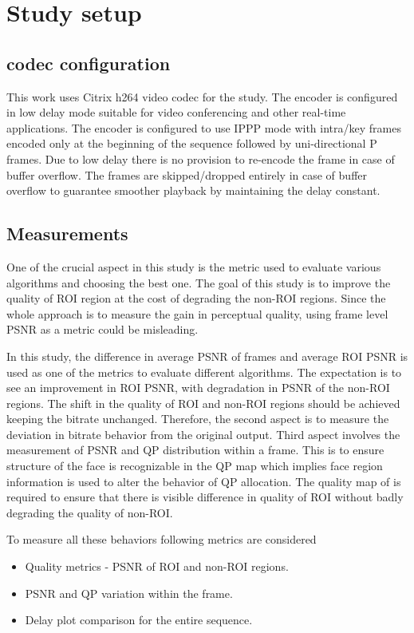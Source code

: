 \documentclass[11pt]{article} %
\begin{document}
\section{Study setup}
\subsection{codec configuration}      
This work uses Citrix h264 video codec for the study. The encoder is configured in low delay mode suitable for video conferencing and other real-time applications. The encoder is configured to use IPPP mode with intra/key frames encoded only at the beginning of the sequence followed by uni-directional P frames. Due to low delay there is no provision to re-encode the frame in case of buffer overflow. The frames are skipped/dropped entirely in case of buffer overflow to guarantee smoother playback by maintaining the delay constant. 
\subsection{Measurements}
One of the crucial aspect in this study is the metric used to evaluate various algorithms and choosing the best one. The goal of this study is to improve the quality of ROI region at the cost of degrading the non-ROI regions. Since the whole approach is to measure the gain in perceptual quality, using frame level PSNR as a metric could be misleading. 

In this study, the difference in average PSNR of frames and average ROI PSNR is used as one of the metrics to evaluate different algorithms. The expectation is to see an improvement in ROI PSNR, with degradation in PSNR of the non-ROI regions. The shift in the quality of ROI and non-ROI regions should be achieved keeping the bitrate unchanged. Therefore, the second aspect is to measure the deviation in bitrate behavior from the original output. Third aspect involves the measurement of PSNR and QP distribution within a frame. This is to ensure structure of the face is recognizable in the QP map which implies face region information is used to alter the behavior of QP allocation. The quality map of is required to ensure that there is visible difference in quality of ROI without badly degrading the quality of non-ROI. 

To measure all these behaviors following metrics are considered
\begin{itemize}  
\item Quality metrics - PSNR of ROI and non-ROI regions.
\item PSNR and QP variation within the frame.
\item Delay plot comparison for the entire sequence.
\end{itemize}
\end{document}
